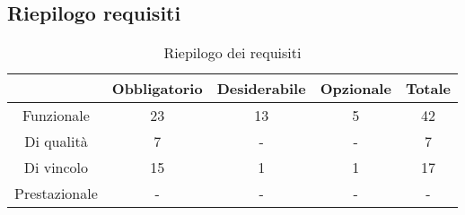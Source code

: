 \subsection{Riepilogo requisiti} \label{subsection: riepilogo}

\begin{table}[H]
	\centering
	\renewcommand{\arraystretch}{1.8}
	\begin{tabular}{c | c | c | c | c}
		\rowcolor[HTML]{125E28}
		\multicolumn{1}{c}{\color[HTML]{FFFFFF} \textbf{Tipologia}}    &
		\multicolumn{1}{c}{\color[HTML]{FFFFFF} \textbf{Obbligatorio}} &
		\multicolumn{1}{c}{\color[HTML]{FFFFFF} \textbf{Desiderabile}} &
		\multicolumn{1}{c}{\color[HTML]{FFFFFF} \textbf{Opzionale}}    &
		\multicolumn{1}{c}{\color[HTML]{FFFFFF} \textbf{Totale}}                          \\
		\hline
		Funzionale                                                     & 23 & 13 & 5 & 42 \\ \hline
		Di qualità                                                     & 7  & -  & - & 7  \\ \hline
		Di vincolo                                                     & 15 & 1  & 1 & 17 \\ \hline
		Prestazionale                                                  & -  & -  & - & -  \\
	\end{tabular}
	\caption{Riepilogo dei requisiti}
\end{table}